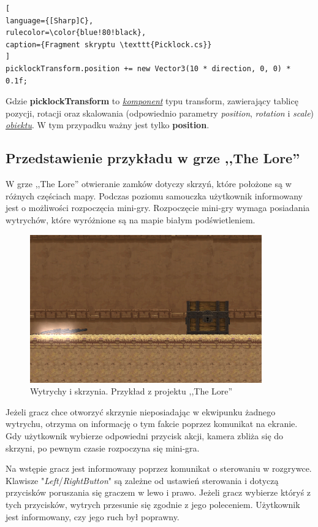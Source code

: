 \documentclass[oneside,polski,logo]{amuthesis}
\begin{document}
\begin{lstlisting}[
language={[Sharp]C},
rulecolor=\color{blue!80!black},
caption={Fragment skryptu \texttt{Picklock.cs}}
]
picklockTransform.position += new Vector3(10 * direction, 0, 0) * 0.1f;
\end{lstlisting}

Gdzie \textbf{picklockTransform} to \hyperref[sec:komponent]{\emph{komponent}} typu transform, zawierający tablicę pozycji, rotacji oraz skalowania (odpowiednio parametry \emph{position}, \emph{rotation} i \emph{scale}) \hyperref[sec:gameobject]{\emph{obiektu}}. W tym przypadku ważny jest tylko \textbf{position}. 

\subsection{Przedstawienie przykładu w grze ,,The Lore''}
W grze ,,The Lore'' otwieranie zamków dotyczy skrzyń, które położone są w różnych częściach mapy. Podczas poziomu samouczka użytkownik informowany jest o możliwości rozpoczęcia mini-gry. Rozpoczęcie mini-gry wymaga posiadania wytrychów, które wyróżnione są na mapie białym podświetleniem.


\begin{figure}[h]
	\centering
	\includegraphics[width=10cm]{images/tyrek/skrzynia.png}
	\caption{Wytrychy i skrzynia. Przykład z projektu ,,The Lore''}
\end{figure}

Jeżeli gracz chce otworzyć skrzynie nieposiadając w ekwipunku żadnego wytrychu, otrzyma on informację o tym fakcie poprzez komunikat na ekranie. Gdy użytkownik wybierze odpowiedni przycisk akcji, kamera zbliża się do skrzyni, po pewnym czasie rozpoczyna się mini-gra.

Na wstępie gracz jest informowany poprzez komunikat o sterowaniu w rozgrywce. Klawisze "\emph{Left}/\emph{RightButton}" są zależne od ustawień sterowania i dotyczą przycisków poruszania się graczem w lewo i prawo. Jeżeli gracz wybierze któryś z tych przycisków, wytrych przesunie się zgodnie z jego poleceniem. Użytkownik jest informowany, czy jego ruch był poprawny.
\end{document}
